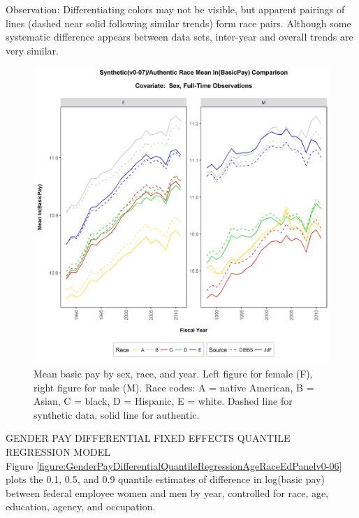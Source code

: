 \documentclass[10pt, letterpaper]{article}
\begin{document}
\begin{spacing}{1.0}
Observation:  Differentiating colors may not be visible, but apparent pairings of lines (dashed near solid following similar trends) form race pairs.  Although some systematic difference appears between data sets, inter-year and overall trends are very similar.

\vspace{12pt}

\begin{figure}[h!]
    \centering
    \includegraphics[width=6.5in, trim={0 0 0 0.75in}, clip]{RaceLogPayBySex-FY.png}
    \caption{Mean basic pay by sex, race, and year.  Left figure for female (F), right figure for male (M).  Race codes:   A = native American, B = Asian, C = black, D = Hispanic, E = white.  Dashed line for synthetic data, solid line for authentic.}
    \label{figure:RaceLogPayBySex-FY}
\end{figure}

\clearpage

GENDER PAY DIFFERENTIAL FIXED EFFECTS QUANTILE REGRESSION MODEL\\

Figure \ref{figure:GenderPayDifferentialQuantileRegressionAgeRaceEdPanelv0-06} plots the 0.1, 0.5, and 0.9 quantile estimates of difference in log(basic pay) between federal employee women and men by year, controlled for race, age, education, agency, and occupation.\\


\end{spacing}
\end{document}
